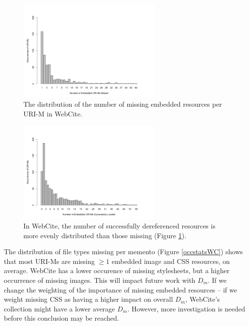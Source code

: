 \begin{figure}[h!]
\includegraphics[width=270px]{./imgs/OccStats_webcite.png}
\caption{The distribution of the number of missing embedded resources per URI-M in WebCite.}
\label{missingDistroWC}
\end{figure}


\begin{figure}[h!]
\includegraphics[width=270px]{./imgs/OccStatsFound_webcite.png}
\caption{In WebCite, the number of successfully dereferenced resources is more evenly distributed than those missing (Figure \ref{missingDistroWC}).}
\label{foundDistroWC}
\end{figure}



The distribution of file types missing per memento (Figure \ref{occstatsWC}) shows that most URI-Ms are missing $\ge 1$ embedded image and CSS resources, on average. WebCite has a lower occurence of missing stylesheets, but a higher occurrence of missing images. This will impact future work with $D_m$. If we change the weighting of the importance of missing embedded resources -- if we weight missing CSS as having a higher impact on overall $D_m$, WebCite's collection might have a lower average $D_m$. However, more investigation is needed before this conclusion may be reached. 

